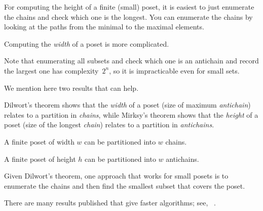 

\begin{hint}
    For computing the height of a finite (small) poset, it is easiest to just enumerate the chains and check which one is the longest.
    You can enumerate the chains by looking at the paths from the minimal to the maximal elements.
\end{hint}

\begin{hint}
    Computing the \emph{width} of a poset is more complicated.

    Note that enumerating all subsets and check which one is an antichain and record the largest one has complexity~$2^n$, so it is impracticable even for small sets.

    We mention here two results that can help.

    Dilwort's theorem shows that the \emph{width} of a poset (size of maximum \emph{antichain}) relates to a partition in \emph{chains}, while Mirksy's theorem shows that the \emph{height} of a poset (size of the longest \emph{chain}) relates to a partition in \emph{antichains}.

    \begin{theorem}
        \label{thm:dilwort}
        A finite poset of width $w$ can be partitioned into $w$ chains.
    \end{theorem}

    \begin{theorem}
        \label{thm:mirsky}
        A finite poset of height $h$ can be partitioned into $w$ antichains.
    \end{theorem}

    Given Dilwort's theorem, one approach that works for small posets is to enumerate the chains and then find the smallest subset that covers the poset.

    There are many results published that give faster algorithms; see, \eg~\cite{chen12decomposition}.

\end{hint}

